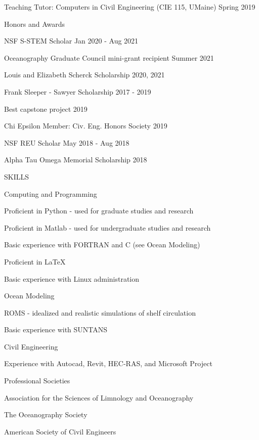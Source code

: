 \documentclass{resume} %
\begin{document}
\begin{rSection}{Teaching}
Tutor: Computers in Civil Engineering (CIE 115, UMaine) \hfill Spring 2019 \\
\end{rSection}
\vspace{-10pt}
\begin{rSection}{Honors and Awards} \itemsep -3pt {}
\vspace{-7pt}
\item NSF S-STEM Scholar \hfill Jan 2020 - Aug 2021 
\item Oceanography Graduate Council mini-grant recipient  \hfill Summer 2021
\item Louis and Elizabeth Scherck Scholarship \hfill 2020, 2021  
\item Frank Sleeper - Sawyer Scholarship \hfill 2017 - 2019
\item Best capstone project \hfill 2019
\item Chi Epsilon Member: Civ. Eng. Honors Society \hfill 2019 
\item NSF REU Scholar \hfill May 2018 - Aug 2018
\item Alpha Tau Omega Memorial Scholarship \hfill 2018
\end{rSection}

\begin{rSection}{SKILLS}
\begin{rSubsection}{Computing and Programming}{}{}{} 
\item Proficient in Python - used for graduate studies and research
\item Proficient in Matlab - used for undergraduate studies and research
\item Basic experience with FORTRAN and C (see Ocean Modeling)
\item Proficient in \LaTeX
\item Basic experience with Linux administration
\end{rSubsection}
\begin{rSubsection}{Ocean Modeling}{}{}{} 
\item ROMS - idealized and realistic simulations of shelf circulation
\item Basic experience with SUNTANS
\end{rSubsection}
\begin{rSubsection}{Civil Engineering}{}{}{} 
\item Experience with Autocad, Revit, HEC-RAS, and Microsoft Project
\end{rSubsection}
\end{rSection}

\begin{rSection}{Professional Societies} \itemsep -3pt {}
\vspace{-7pt}
\item Association for the Sciences of Limnology and Oceanography
\item The Oceanography Society 
\item American Society of Civil Engineers
\end{rSection}


\end{document}
